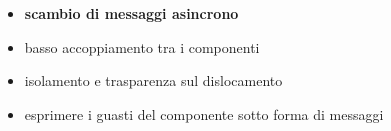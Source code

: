 \begin{frame}[c]{\insertsectionhead}{\insertsubsectionhead}
\begin{columns}
\begin{column}{.47\textwidth}
                    \subsubsection{}\label{subsub:meddagedriven}
                    \begin{block}{\insertsubsubsectionhead}
                        \begin{itemize}
                            \item
                                \textbf{scambio di messaggi asincrono}
                            \item
                                basso accoppiamento tra i componenti
                            \item
                                isolamento e trasparenza sul dislocamento
                            \item
                                esprimere i guasti del componente sotto forma di messaggi
                        \end{itemize}
                    \end{block}
                \end{column}
            \end{columns}
        \end{frame}

